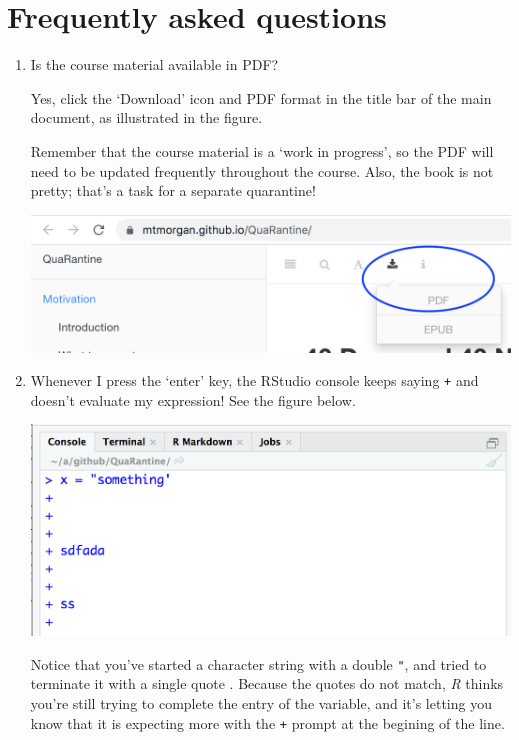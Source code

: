 \documentclass[
]{book}
\begin{document}
\hypertarget{frequently-asked-questions}{%
\chapter*{Frequently asked questions}\label{frequently-asked-questions}}

\begin{enumerate}
\def\labelenumi{\arabic{enumi}.}
\item
  Is the course material available in PDF?

  Yes, click the `Download' icon and PDF format in the title bar of the main document, as illustrated in the figure.

  Remember that the course material is a `work in progress', so the PDF will need to be updated frequently throughout the course. Also, the book is not pretty; that's a task for a separate quarantine!

  \includegraphics{images/99-Download-PDF.png}
\item
  Whenever I press the `enter' key, the RStudio console keeps saying \texttt{+} and doesn't evaluate my expression! See the figure below.

  \includegraphics{images/99-console-plus-1.png}

  Notice that you've started a character string with a double \texttt{"}, and tried to terminate it with a single quote \texttt{\textquotesingle{}}. Because the quotes do not match, \emph{R} thinks you're still trying to complete the entry of the variable, and it's letting you know that it is expecting more with the \texttt{+} prompt at the begining of the line.


\end{enumerate}
\end{document}
